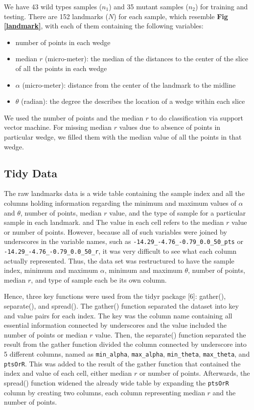 \documentclass[10pt,letterpaper]{article}
\providecommand{\tightlist}{%
  \setlength{\itemsep}{0pt}\setlength{\parskip}{0pt}}
\begin{document}
We have 43 wild types samples (\(n_1\)) and 35 mutant samples (\(n_2\))
for training and testing. There are 152 landmarks (\(N\)) for each
sample, which resemble \textbf{Fig \ref{landmark}}, with each of them
containing the following variables:

\begin{itemize}
\tightlist
\item
  number of points in each wedge
\item
  median \(r\) (micro-meter): the median of the distances to the center
  of the slice of all the points in each wedge
\item
  \(\alpha\) (micro-meter): distance from the center of the landmark to
  the midline
\item
  \(\theta\) (radian): the degree the describes the location of a wedge
  within each slice
\end{itemize}

We used the number of points and the median \(r\) to do classification
via support vector machine. For missing median \(r\) values due to
absence of points in particular wedge, we filled them with the median
value of all the points in that wedge.

\subsection{Tidy Data}\label{tidy-data}

The raw landmarks data is a wide table containing the sample index and
all the columns holding information regarding the minimum and maximum
values of \(\alpha\) and \(\theta\), number of points, median \(r\)
value, and the type of sample for a particular sample in each landmark.
and The value in each cell refers to the median \(r\) value or number of
points. However, because all of such variables were joined by
underscores in the variable names, such as
\texttt{-14.29\_-4.76\_-0.79\_0.0\_50\_pts} or
\texttt{-14.29\_-4.76\_-0.79\_0.0\_50\_r}, it was very difficult to see
what each column actually represented. Thus, the data set was
restructured to have the sample index, minimum and maximum \(\alpha\),
minimum and maximum \(\theta\), number of points, median \(r\), and type
of sample each be its own column.

Hence, three key functions were used from the tidyr package {[}6{]}:
gather(), separate(), and spread(). The gather() function separated the
dataset into key and value pairs for each index. The key was the column
name containing all essential information connected by underscores and
the value included the number of points or median \(r\) value. Then, the
separate() function separated the result from the gather function
divided the column connected by underscore into 5 different columns,
named as \texttt{min\_alpha}, \texttt{max\_alpha}, \texttt{min\_theta},
\texttt{max\_theta}, and \texttt{ptsOrR}. This was added to the result
of the gather function that contained the index and value of each cell,
either median \(r\) or number of points. Afterwards, the spread()
function widened the already wide table by expanding the \texttt{ptsOrR}
column by creating two columns, each column representing median \(r\)
and the number of points.
\end{document}

